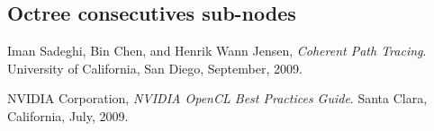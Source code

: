 \documentclass[10pt,twocolumn,a4paper]{article}
\begin{document}
\subsection{Octree consecutives sub-nodes}




\begin{thebibliography}{9}

    Iman Sadeghi, Bin Chen, and Henrik Wann Jensen,
    \emph{Coherent Path Tracing}.
    University of California, San Diego,
    September, 2009.

    NVIDIA Corporation,
    \emph{NVIDIA OpenCL Best Practices Guide}.
    Santa Clara, California,
    July, 2009.

\end{thebibliography}
\end{document}
